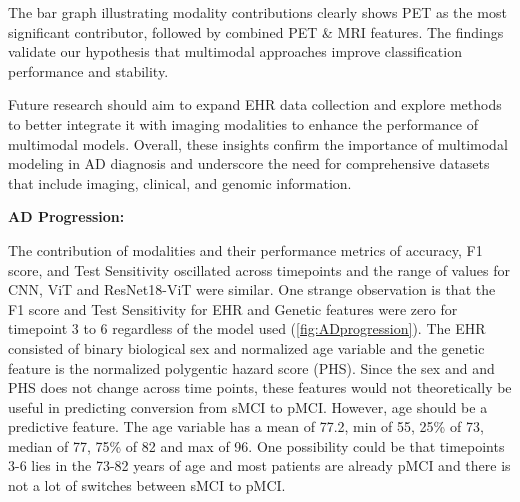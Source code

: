 The bar graph illustrating modality contributions clearly shows PET as the most significant contributor, followed by combined PET \& MRI features. The findings validate our hypothesis that multimodal approaches improve classification performance and stability. 

Future research should aim to expand EHR data collection and explore methods to better integrate it with imaging modalities to enhance the performance of multimodal models. Overall, these insights confirm the importance of multimodal modeling in AD diagnosis and underscore the need for comprehensive datasets that include imaging, clinical, and genomic information. 

\textbf{AD Progression: }

The contribution of modalities and their performance metrics of accuracy, F1 score, and Test Sensitivity oscillated across timepoints and the range of values for CNN, ViT and ResNet18-ViT were similar. One strange observation is that the F1 score and Test Sensitivity for EHR and Genetic features were zero for timepoint 3 to 6 regardless of the model used (\autoref{fig:ADprogression}). The EHR consisted of binary biological sex and normalized age variable and the genetic feature is the normalized polygentic hazard score (PHS). Since the sex and and PHS does not change across time points, these features would not theoretically be useful in predicting conversion from sMCI to pMCI. However, age should be a predictive feature. The age variable has a mean of 77.2, min of 55, 25\% of 73, median of 77, 75\% of 82 and max of 96. One possibility could be that timepoints 3-6 lies in the 73-82 years of age and most patients are already pMCI and there is not a lot of switches between sMCI to pMCI. 

\
